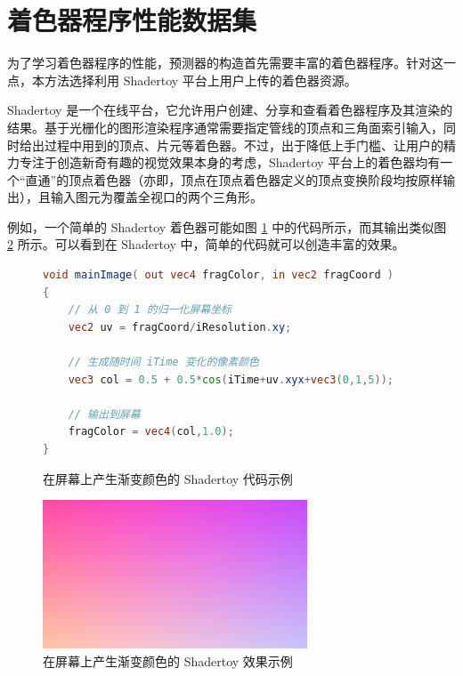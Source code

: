 \section{着色器程序性能数据集}

\label{sec:dataset}

为了学习着色器程序的性能，预测器的构造首先需要丰富的着色器程序。针对这一点，本方法选择利用 Shadertoy \cite{Shadertoy} 平台上用户上传的着色器资源。

Shadertoy 是一个在线平台，它允许用户创建、分享和查看着色器程序及其渲染的结果。基于光栅化的图形渲染程序通常需要指定管线的顶点和三角面索引输入，同时给出过程中用到的顶点、片元等着色器。不过，{\amend 出于}降低上手门槛、让用户的精力专注于创造新奇有趣的视觉效果本身{\amend 的考虑}，Shadertoy 平台上的着色器均有一个“直通”的顶点着色器（亦即，顶点在顶点着色器定义的顶点变换阶段均按原样输出），且输入图元为覆盖全视口的两个三角形。

例如，一个简单的 Shadertoy 着色器可能如图 \ref{fig:example_glsl_shadertoy_code} 中的代码所示，而其输出类似图 \ref{fig:example_shadertoy_output} 所示。可以看到在 Shadertoy 中，简单的代码就可以创造丰富的效果。

\begin{figure}  %
\centering

\begin{lstlisting}[language=GLSL]
void mainImage( out vec4 fragColor, in vec2 fragCoord )
{
    // 从 0 到 1 的归一化屏幕坐标
    vec2 uv = fragCoord/iResolution.xy;

    // 生成随时间 iTime 变化的像素颜色
    vec3 col = 0.5 + 0.5*cos(iTime+uv.xyx+vec3(0,1,5));

    // 输出到屏幕
    fragColor = vec4(col,1.0);
}
\end{lstlisting}
\caption{在屏幕上产生渐变颜色的 Shadertoy 代码示例}
\label{fig:example_glsl_shadertoy_code}
\end{figure}

\begin{figure}
\centering
\includegraphics[width=0.7\textwidth]{figures/example_shadertoy_output.png}
\caption{在屏幕上产生渐变颜色的 Shadertoy 效果示例}
\label{fig:example_shadertoy_output}
\end{figure}

